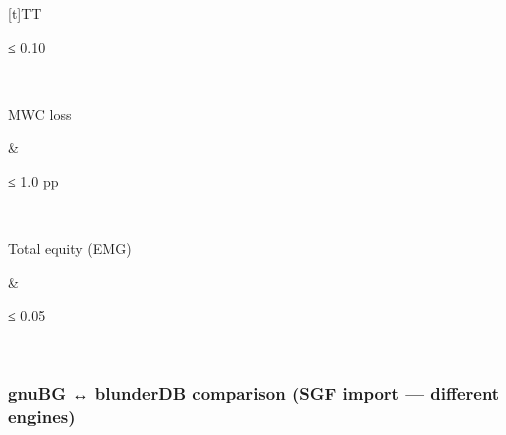 \documentclass[letterpaper,10pt,english]{sphinxmanual}
\begin{document}
\begin{savenotes}
\begin{tabulary}{\linewidth}[t]{TT}
\begin{varwidth}[t]{}
\sphinxAtStartPar
≤ 0.10
\sphinxbeforeendvarwidth
\end{varwidth}%
\\
\sphinxhline\begin{varwidth}[t]{}
\sphinxAtStartPar
MWC loss
\sphinxbeforeendvarwidth
\end{varwidth}%
&\begin{varwidth}[t]{}
\sphinxAtStartPar
≤ 1.0 pp
\sphinxbeforeendvarwidth
\end{varwidth}%
\\
\sphinxhline\begin{varwidth}[t]{}
\sphinxAtStartPar
Total equity (EMG)
\sphinxbeforeendvarwidth
\end{varwidth}%
&\begin{varwidth}[t]{}
\sphinxAtStartPar
≤ 0.05
\sphinxbeforeendvarwidth
\end{varwidth}%
\\
\sphinxbottomrule
\end{tabulary}
\sphinxtableafterendhook\par
\sphinxattableend\end{savenotes}


\subsubsection{gnuBG ↔ blunderDB comparison (SGF import — different engines)}
\label{\detokenize{stats_parity:comparaison-gnubg-blunderdb-import-sgf-moteurs-differents}}
\end{document}
